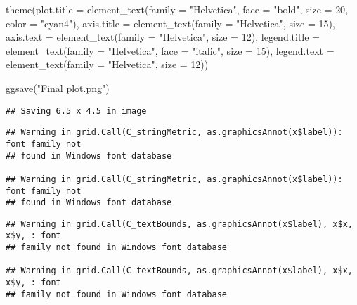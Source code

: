 \documentclass[
]{book}
\newenvironment{Shaded}{\begin{snugshade}}{\end{snugshade}}
\newcommand{\AttributeTok}[1]{\textcolor[rgb]{0.77,0.63,0.00}{#1}}
\newcommand{\DecValTok}[1]{\textcolor[rgb]{0.00,0.00,0.81}{#1}}
\newcommand{\FunctionTok}[1]{\textcolor[rgb]{0.00,0.00,0.00}{#1}}
\newcommand{\NormalTok}[1]{#1}
\newcommand{\StringTok}[1]{\textcolor[rgb]{0.31,0.60,0.02}{#1}}
\begin{document}
\begin{Shaded}
\begin{Highlighting}[]
    \FunctionTok{theme}\NormalTok{(}\AttributeTok{plot.title =} \FunctionTok{element\_text}\NormalTok{(}\AttributeTok{family =} \StringTok{"Helvetica"}\NormalTok{, }\AttributeTok{face =} \StringTok{"bold"}\NormalTok{, }\AttributeTok{size =} \DecValTok{20}\NormalTok{, }\AttributeTok{color =} \StringTok{"cyan4"}\NormalTok{),}
          \AttributeTok{axis.title =} \FunctionTok{element\_text}\NormalTok{(}\AttributeTok{family =} \StringTok{"Helvetica"}\NormalTok{, }\AttributeTok{size =} \DecValTok{15}\NormalTok{),}
          \AttributeTok{axis.text =} \FunctionTok{element\_text}\NormalTok{(}\AttributeTok{family =} \StringTok{"Helvetica"}\NormalTok{, }\AttributeTok{size =} \DecValTok{12}\NormalTok{),}
          \AttributeTok{legend.title =} \FunctionTok{element\_text}\NormalTok{(}\AttributeTok{family =} \StringTok{"Helvetica"}\NormalTok{, }\AttributeTok{face =} \StringTok{"italic"}\NormalTok{, }\AttributeTok{size =} \DecValTok{15}\NormalTok{), }
          \AttributeTok{legend.text =} \FunctionTok{element\_text}\NormalTok{(}\AttributeTok{family =} \StringTok{"Helvetica"}\NormalTok{, }\AttributeTok{size =} \DecValTok{12}\NormalTok{))}
\end{Highlighting}
\end{Shaded}

\begin{Shaded}
\begin{Highlighting}[]
\FunctionTok{ggsave}\NormalTok{(}\StringTok{"Final plot.png"}\NormalTok{)}
\end{Highlighting}
\end{Shaded}

\begin{verbatim}
## Saving 6.5 x 4.5 in image
\end{verbatim}

\begin{verbatim}
## Warning in grid.Call(C_stringMetric, as.graphicsAnnot(x$label)): font family not
## found in Windows font database

## Warning in grid.Call(C_stringMetric, as.graphicsAnnot(x$label)): font family not
## found in Windows font database
\end{verbatim}

\begin{verbatim}
## Warning in grid.Call(C_textBounds, as.graphicsAnnot(x$label), x$x, x$y, : font
## family not found in Windows font database

## Warning in grid.Call(C_textBounds, as.graphicsAnnot(x$label), x$x, x$y, : font
## family not found in Windows font database
\end{verbatim}
\end{document}
